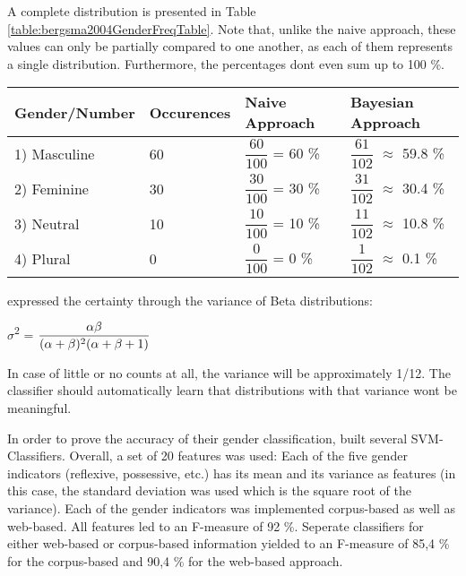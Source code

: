 A complete distribution is presented in Table \ref{table:bergsma2004GenderFreqTable}. Note that, unlike the naive approach, these values can only be partially compared to one another, as each of them represents a single distribution. Furthermore, the percentages dont even sum up to 100 \%.

\begin{center}
    \renewcommand{\arraystretch}{2.0}
    \begin{tabular}{| l | l | l | l |}
    \hline
    Gender/Number & Occurences & Naive Approach & Bayesian Approach \\ \hline
\hline
    1) Masculine & 60 & $\dfrac{60}{100}$ = 60 \% &  $\dfrac{61}{102}$ $\approx$ 59.8 \% \\ \hline
    2) Feminine & 30 &  $\dfrac{30}{100}$ = 30 \% &  $\dfrac{31}{102}$ $\approx$ 30.4 \% \\ \hline
    3) Neutral & 10 & $\dfrac{10}{100}$ = 10 \% & $\dfrac{11}{102}$ $\approx$ 10.8 \%  \\ \hline
    4) Plural & 0 &    $\dfrac{0}{100}$ =  0 \% &  $\dfrac{1}{102}$ $\approx$ 0.1 \% \\ \hline
    \end{tabular}
     \label{table:bergsma2004GenderFreqTable}
\end{center}

 \cite{bergsma2005automatic} expressed the certainty through the variance of Beta distributions:

\begin{center}
	$\sigma$\textsuperscript{2} =  $\dfrac{\alpha \beta }{(\alpha + \beta)\textsuperscript{2}(\alpha + \beta + 1)}$
\end{center}

In case of little or no counts at all, the variance will be approximately 1/12. The classifier should automatically learn that distributions with that variance wont be meaningful.


In order to prove the accuracy of their gender classification, \cite{bergsma2005automatic} built several SVM-Classifiers. Overall, a set of 20 features was used: Each of the five gender indicators (reflexive, possessive, etc.) has its mean and its variance as features (in this case, the standard deviation was used which is the square root of the variance). Each of the gender indicators was implemented corpus-based as well as web-based. All features led to an F-measure of 92 \%. Seperate classifiers for either web-based or corpus-based information yielded to an F-measure of 85,4 \% for the corpus-based and 90,4 \% for the web-based approach.

